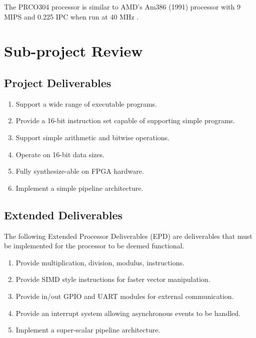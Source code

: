 \documentclass[11pt,a4paper]{report}
\newcommand{\scname}{PRCO304}
\begin{document}
The \scname{} processor is similar to AMD's Am386 (1991) processor with 9 MIPS and 0.225 IPC when run at 40 MHz \cite{am386}.


\newpage
\section{Sub-project Review}
\subsection{Project Deliverables}
\begin{enumerate}[label=\bfseries CPD\arabic*.]
\item{Support a wide range of executable programs.}
\item{Provide a 16-bit instruction set capable of supporting simple programs.}
\item{Support simple arithmetic and bitwise operations.}
\item{Operate on 16-bit data sizes.}
\item{Fully synthesize-able on FPGA hardware.}
\item{Implement a simple pipeline architecture.}
\end{enumerate}

\subsection{Extended Deliverables}
The following Extended Processor Deliverables (EPD) are deliverables that must be implemented for the processor to be deemed functional.
\begin{enumerate}[label=\bfseries EPD\arabic*.]
\item{Provide multiplication, division, modulus, instructions.}
\item{Provide SIMD style instructions for faster vector manipulation.}
\item{Provide in/out GPIO and UART modules for external communication.}
\item{Provide an interrupt system allowing asynchronous events to be handled.}
\item{Implement a super-scalar pipeline architecture.}
\end{enumerate}
\end{document}
